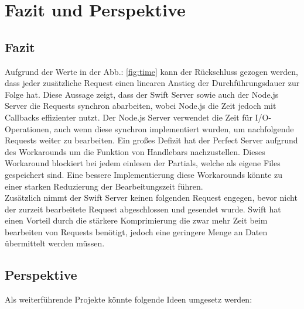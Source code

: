 \chapter{Fazit und Perspektive}\label{chap:conclusion}
\chapterstart

\section{Fazit}

Aufgrund der Werte in der Abb.: \ref{fig:time} kann der Rückschluss gezogen werden, dass jeder zusätzliche Request einen linearen Anstieg der Durchführungsdauer zur Folge hat. Diese Aussage zeigt, dass der Swift Server sowie auch der Node.js Server die Requests synchron abarbeiten, wobei Node.js die Zeit jedoch mit Callbacks effizienter nutzt. Der Node.js Server verwendet die Zeit für I/O-Operationen, auch wenn diese synchron implementiert wurden, um nachfolgende Requests weiter zu bearbeiten. Ein großes Defizit hat der Perfect Server aufgrund des Workarounds um die Funktion von Handlebars nachzustellen. Dieses Workaround blockiert bei jedem einlesen der Partials, welche als eigene Files gespeichert sind. Eine bessere Implementierung diese Workarounds könnte zu einer starken Reduzierung der Bearbeitungszeit führen.\\
Zusätzlich nimmt der Swift Server keinen folgenden Request engegen, bevor nicht der zurzeit bearbeitete Request abgeschlossen und gesendet wurde. Swift hat einen Vorteil durch die stärkere Komprimierung die zwar mehr Zeit beim bearbeiten von Requests benötigt, jedoch eine geringere Menge an Daten übermittelt werden müssen.



\section{Perspektive}

Als weiterführende Projekte könnte folgende Ideen umgesetz werden:

